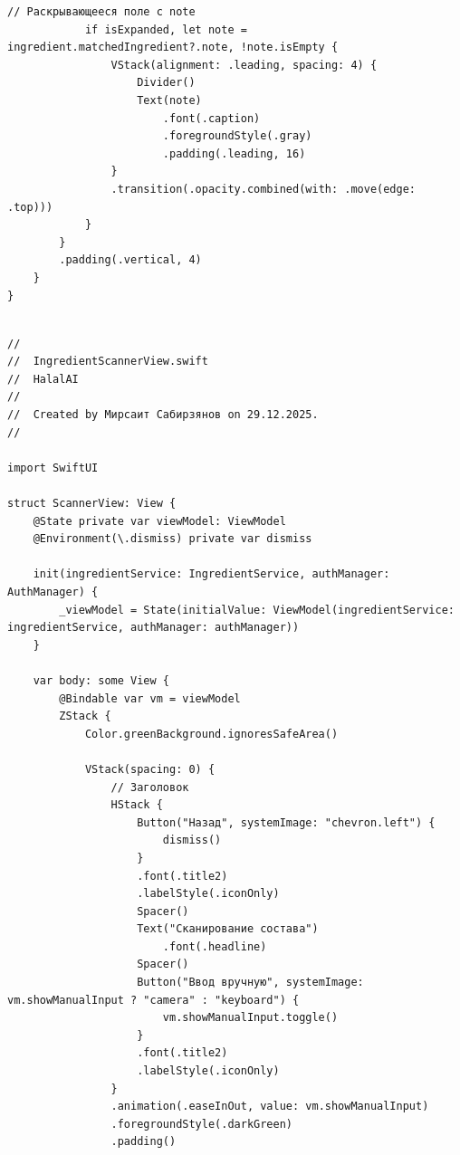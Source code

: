 \begin{lstlisting}[basicstyle=\tiny\ttfamily,breaklines=true]
            // Раскрывающееся поле с note
            if isExpanded, let note = ingredient.matchedIngredient?.note, !note.isEmpty {
                VStack(alignment: .leading, spacing: 4) {
                    Divider()
                    Text(note)
                        .font(.caption)
                        .foregroundStyle(.gray)
                        .padding(.leading, 16)
                }
                .transition(.opacity.combined(with: .move(edge: .top)))
            }
        }
        .padding(.vertical, 4)
    }
}
\end{lstlisting}

\begin{lstlisting}[basicstyle=\tiny\ttfamily,breaklines=true]

//
//  IngredientScannerView.swift
//  HalalAI
//
//  Created by Мирсаит Сабирзянов on 29.12.2025.
//

import SwiftUI

struct ScannerView: View {
    @State private var viewModel: ViewModel
    @Environment(\.dismiss) private var dismiss

    init(ingredientService: IngredientService, authManager: AuthManager) {
        _viewModel = State(initialValue: ViewModel(ingredientService: ingredientService, authManager: authManager))
    }
    
    var body: some View {
        @Bindable var vm = viewModel
        ZStack {
            Color.greenBackground.ignoresSafeArea()
            
            VStack(spacing: 0) {
                // Заголовок
                HStack {
                    Button("Назад", systemImage: "chevron.left") {
                        dismiss()
                    }
                    .font(.title2)
                    .labelStyle(.iconOnly)
                    Spacer()
                    Text("Сканирование состава")
                        .font(.headline)
                    Spacer()
                    Button("Ввод вручную", systemImage: vm.showManualInput ? "camera" : "keyboard") {
                        vm.showManualInput.toggle()
                    }
                    .font(.title2)
                    .labelStyle(.iconOnly)
                }
                .animation(.easeInOut, value: vm.showManualInput)
                .foregroundStyle(.darkGreen)
                .padding()
                

\end{lstlisting}
